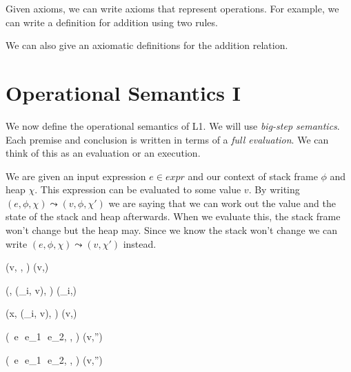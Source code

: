 Given axioms, we can write axioms that represent operations.
For example, we can write a definition for addition using two rules.

{}

{}


 
We can also give an axiomatic definitions for the addition relation.



\section{Operational Semantics I}

We now define the operational semantics of L1.
We will use \textit{big-step semantics}.
Each premise and conclusion is written in terms 
of a \textit{full evaluation}. 
We can think of this as an evaluation or an execution.


We are given an input expression $e \in expr$ and our context
of stack frame $\phi$ and heap $\chi$. This expression can 
be evaluated to some value $v$. 
By writing $(e, \phi, \chi) \leadsto (v,\phi, \chi')$ we are 
saying that we can work out the value and 
the state of the stack and heap afterwards. 
When we evaluate this, 
the stack frame won't change but the heap may.
Since we know the stack won't change we can write 
$(e, \phi, \chi) \leadsto (v, \chi')$ instead.



{(v, \phi, \chi) \leadsto (v,\chi) }

{(, (\iota_i, v), \chi) \leadsto (\iota_i,\chi) }

{(x, (\iota_i, v), \chi) \leadsto (v,\chi) }

{( \,e\,  \,e_1\,  \,e_2, \phi, \chi) 
\leadsto (v,\chi'') }

{( \,e\,  \,e_1\,  \,e_2, \phi, \chi) 
\leadsto (v,\chi'') }

